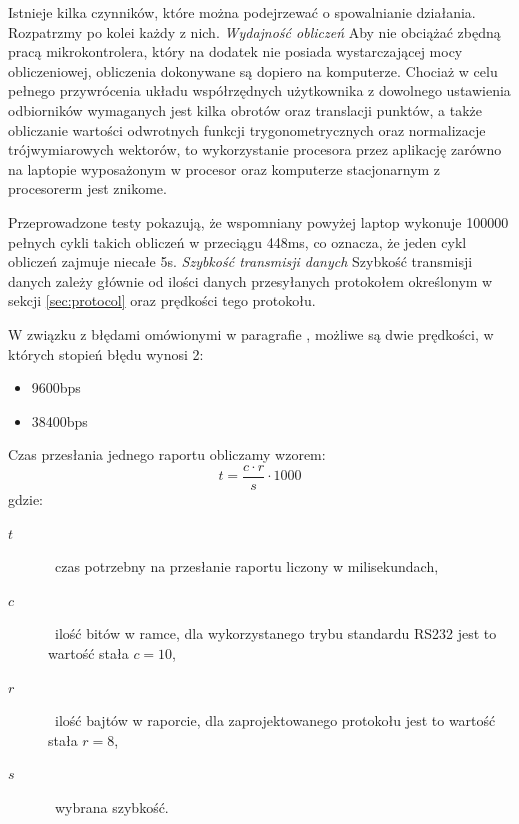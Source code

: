 Istnieje kilka czynników, które można podejrzewać o spowalnianie działania. Rozpatrzmy po kolei każdy z nich.
\newline
\newline
\textsl{Wydajność obliczeń}
Aby nie obciążać zbędną pracą mikrokontrolera, który na dodatek nie posiada wystarczającej mocy obliczeniowej, obliczenia dokonywane są dopiero na komputerze. Chociaż w celu pełnego przywrócenia układu współrzędnych użytkownika z dowolnego ustawienia odbiorników wymaganych jest kilka obrotów oraz translacji punktów, a także obliczanie wartości odwrotnych funkcji trygonometrycznych oraz normalizacje trójwymiarowych wektorów, to wykorzystanie procesora przez aplikację zarówno na laptopie wyposażonym w procesor  oraz komputerze stacjonarnym z procesorerm  jest znikome.

Przeprowadzone testy pokazują, że wspomniany powyżej laptop wykonuje 100000 pełnych cykli takich obliczeń w przeciągu 448ms, co oznacza, że jeden cykl obliczeń zajmuje niecałe 5\textmu s.
\newline
\newline
\textsl{Szybkość transmisji danych}
Szybkość transmisji danych zależy głównie od ilości danych przesyłanych protokołem określonym w sekcji \ref{sec:protocol} oraz prędkości tego protokołu.

W związku z błędami omówionymi w paragrafie , możliwe są dwie prędkości, w których stopień błędu wynosi 2\textperthousand:
\begin{itemize}
 \item 9600bps
 \item 38400bps
\end{itemize}

Czas przesłania jednego raportu obliczamy wzorem:
\begin{equation}
 t = \frac{c \cdot r}{s} \cdot 1000
\end{equation}
gdzie:
\begin{description}
 \item[$t$] \ppauza~czas potrzebny na przesłanie raportu liczony w milisekundach,
 \item[$c$] \ppauza~ilość bitów w ramce, dla wykorzystanego trybu standardu RS232 jest to wartość stała $c = 10$,
 \item[$r$] \ppauza~ilość bajtów w raporcie, dla zaprojektowanego protokołu jest to wartość stała $r = 8$,
 \item[$s$] \ppauza~wybrana szybkość.
\end{description}

